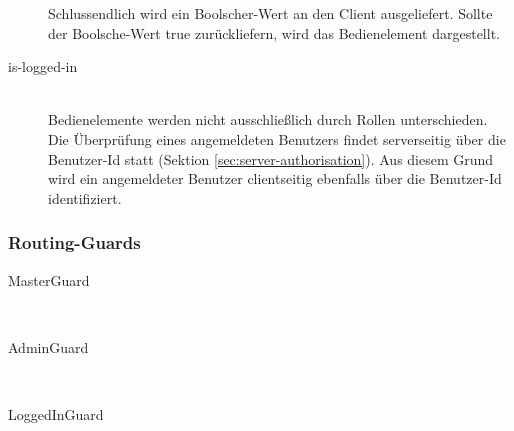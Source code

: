 \begin{description}
	\begin{minipage}{\linewidth}
		
	\end{minipage}

	Schlussendlich wird ein Boolscher-Wert an den Client ausgeliefert. Sollte der Boolsche-Wert true zurückliefern, wird das Bedienelement dargestellt.
	
	\item[is-logged-in]\hfill\\
	Bedienelemente werden nicht ausschließlich durch Rollen unterschieden. Die Überprüfung eines angemeldeten Benutzers findet serverseitig über die Benutzer-Id statt (Sektion \ref{sec:server-authorisation}). Aus diesem Grund wird ein angemeldeter Benutzer clientseitig ebenfalls über die Benutzer-Id identifiziert.  
	
\end{description}

\subsubsection{Routing-Guards}
\label{sec:routing-guards}

\begin{description}
	\item[MasterGuard]\hfill\\
	\item[AdminGuard]\hfill\\
	\item[LoggedInGuard]\hfill\\
\end{description}
